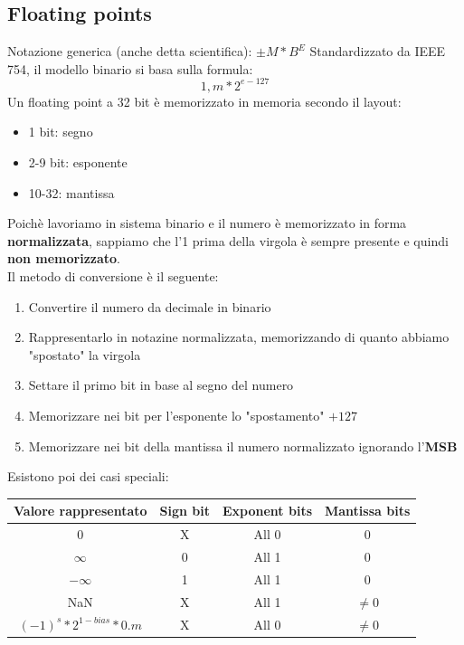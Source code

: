 \documentclass{report}
\begin{document}
    \subsection{Floating points}     
        Notazione generica (anche detta scientifica): $\pm M * B^E$     
        Standardizzato da IEEE 754, il modello binario si basa sulla formula:
        $$1,m * 2^{e-127}$$
        Un floating point a 32 bit è memorizzato in memoria secondo il layout:
        \begin{itemize}
            \item 1 bit: segno
            \item 2-9 bit: esponente
            \item 10-32: mantissa
        \end{itemize}
        Poichè lavoriamo in sistema binario e il numero è memorizzato
        in forma \textbf{normalizzata}, sappiamo che
        l'1 prima della virgola è sempre presente e quindi \textbf{non memorizzato}. \\
        Il metodo di conversione è il seguente:
        \begin{enumerate}
            \item Convertire il numero da decimale in binario
            \item Rappresentarlo in notazine normalizzata, memorizzando di quanto
                abbiamo "spostato" la virgola
            \item Settare il primo bit in base al segno del numero
            \item Memorizzare nei bit per l'esponente lo "spostamento" $+ 127$
            \item Memorizzare nei bit della mantissa
                il numero normalizzato ignorando l'\textbf{MSB}
        \end{enumerate}
        Esistono poi dei casi speciali:
        \begin{center}
            \begin{tabular}{|c|c|c|c|}
                \hline
                Valore rappresentato & Sign bit & Exponent bits & Mantissa bits  \\
                \hline
                0 & X & All 0 & 0 \\
                \hline
                $\infty$ & 0 & All 1 & 0 \\
                \hline
                $- \infty$ & 1 & All 1 & 0 \\
                \hline
                NaN & X & All 1 & $\neq 0$ \\
                \hline
                $(-1)^s * 2^{1-bias} * 0.m$ & X & All 0 & $\neq 0$ \\
                \hline
            \end{tabular}
        \end{center}
\end{document}
